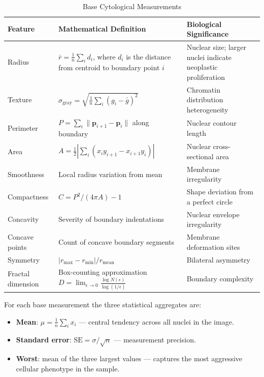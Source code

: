 \documentclass[10pt,letterpaper]{article}
\begin{document}
\begin{table}[h]
\centering
\caption{Base Cytological Measurements}
\label{tab:features_base}
\begin{tabular}{p{3.2cm}p{5.0cm}p{4.8cm}}
\toprule
\textbf{Feature} & \textbf{Mathematical Definition} & \textbf{Biological Significance} \\
\midrule
Radius & $\bar{r} = \frac{1}{n}\sum_i d_i$, where $d_i$ is the distance from centroid to boundary point $i$ & Nuclear size; larger nuclei indicate neoplastic proliferation \\
Texture & $\sigma_{\text{gray}} = \sqrt{\frac{1}{n}\sum_i(g_i - \bar{g})^2}$ & Chromatin distribution heterogeneity \\
Perimeter & $P = \sum_i \|\mathbf{p}_{i+1} - \mathbf{p}_i\|$ along boundary & Nuclear contour length \\
Area & $A = \frac{1}{2}\left|\sum_i(x_i y_{i+1} - x_{i+1} y_i)\right|$ & Nuclear cross-sectional area \\
Smoothness & Local radius variation from mean & Membrane irregularity \\
Compactness & $C = P^2/(4\pi A) - 1$ & Shape deviation from a perfect circle \\
Concavity & Severity of boundary indentations & Nuclear envelope irregularity \\
Concave points & Count of concave boundary segments & Membrane deformation sites \\
Symmetry & $|r_{\max} - r_{\min}|/r_{\text{mean}}$ & Bilateral asymmetry \\
Fractal dimension & Box-counting approximation $D = \lim_{\epsilon\to 0} \frac{\log N(\epsilon)}{\log(1/\epsilon)}$ & Boundary complexity \\
\bottomrule
\end{tabular}
\end{table}

For each base measurement the three statistical aggregates are:
\begin{itemize}
    \item \textbf{Mean}: $\mu = \frac{1}{n}\sum_i x_i$ — central tendency across all nuclei in the image.
    \item \textbf{Standard error}: $\text{SE} = \sigma/\sqrt{n}$ — measurement precision.
    \item \textbf{Worst}: mean of the three largest values — captures the most aggressive cellular
    phenotype in the sample.
\end{itemize}
\end{document}

